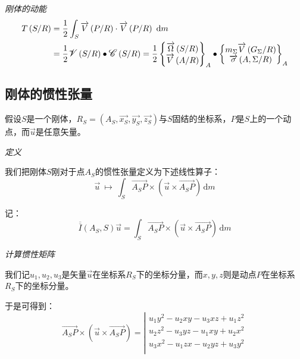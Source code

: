 \documentclass[UTF8]{ctexart}%
\begin{document}
\emph{刚体的动能}
\begin{align}
T\left(S/R\right)&=\frac{1}{2}\int_{S}\overrightarrow{V}\left(P/R\right)\cdot\overrightarrow{V}\left(P/R\right)\ \mathrm{d}m\notag \\ &=\frac{1}{2}\mathlarger{\mathscr{V}}\left(S/R\right)\bullet \mathlarger{\mathscr{C}}\left(S/R\right)=\frac{1}{2}\left\{\begin{matrix}
  \overrightarrow{\Omega}\left(S/R\right) \\
  \overrightarrow{V}\left(A/R\right)
 \end{matrix} \right\}_A\bullet \left\{\begin{matrix}
	m_{\Sigma}\overrightarrow{V}\left(G_{\Sigma}/R\right)\\
	\overrightarrow{\sigma}\left(A, \Sigma/R\right)
 \end{matrix} \right\}_A
\end{align}

\subsection{刚体的惯性张量}
\label{sec:刚体的惯性张量}
假设$S$是一个刚体，$R_S=\left( A_S,\overrightarrow{x_S},\overrightarrow{y_S},\overrightarrow{z_S}\right)$与$S$固结的坐标系，$P$是$S$上的一个动点，而$\overrightarrow{u}$是任意矢量。

\emph{定义}

我们把刚体$S$刚对于点$A_S$的惯性张量定义为下述线性算子：
\begin{equation}
    \overrightarrow{u}\ \mapsto \ \int_S{\overrightarrow{A_SP}\times \left( \overrightarrow{u}\times \overrightarrow{A_SP}\right)}\,\mathrm{d}m
\end{equation}

记：
\begin{equation}
    \overline{\overline{I}}\left(A_S,S\right) \overrightarrow{u}=\int_S{\overrightarrow{A_SP}\times \left( \overrightarrow{u}\times \overrightarrow{A_SP}\right)}\,\mathrm{d}m
\end{equation}

\emph{计算惯性矩阵}

我们记$u_1,u_2,u_3$是矢量$\overrightarrow{u}$在坐标系$R_S$下的坐标分量，而$x,y,z$则是动点$P$在坐标系$R_S$下的坐标分量。

于是可得到：
\begin{equation}
\overrightarrow{A_SP}\times\left( \overrightarrow{u}\times \overrightarrow{A_SP}\right) =\left|\begin{matrix}
	u_1y^2-u_2xy-u_3xz+u_1z^2 \\
	u_2z^2-u_3yz-u_1xy+u_2x^2 \\
	u_3x^2-u_1zx-u_2yz+u_3y^2 \\
	\end{matrix}\right.
\end{equation}
\end{document}
